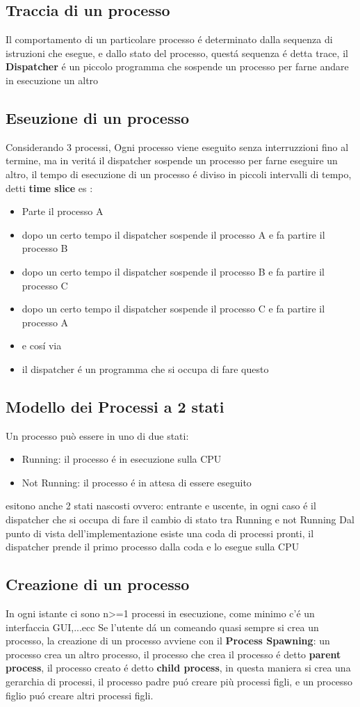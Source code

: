 \subsection{Traccia di un processo}
Il comportamento di un particolare processo é determinato dalla sequenza di istruzioni che esegue, e dallo stato del processo,
questá sequenza é detta trace, il \textbf{Dispatcher} é un piccolo programma che sospende un processo per farne andare in esecuzione un altro
\subsection{Eseuzione di un processo}
Considerando 3 processi, Ogni processo viene eseguito senza interruzzioni fino al termine, ma in veritá il dispatcher
sospende un processo per farne eseguire un altro, il tempo di esecuzione di un processo é diviso in piccoli intervalli
di tempo, detti \textbf{time slice} es :
\begin{itemize}
    \item Parte il processo A
    \item dopo un certo tempo il dispatcher sospende il processo A e fa partire il processo B
    \item dopo un certo tempo il dispatcher sospende il processo B e fa partire il processo C
    \item dopo un certo tempo il dispatcher sospende il processo C e fa partire il processo A
    \item e cosí via
    \item il dispatcher é un programma che si occupa di fare questo
\end{itemize}
\subsection{Modello dei Processi a 2 stati}
Un processo può essere in uno di due stati:
\begin{itemize}
    \item Running: il processo é in esecuzione sulla CPU
    \item Not Running: il processo é in attesa di essere eseguito
\end{itemize}
esitono anche 2 stati nascosti ovvero: entrante e uscente, in ogni caso é il dispatcher che si occupa di fare il cambio di stato tra Running e not Running
Dal punto di vista dell'implementazione esiste una coda di processi pronti, il dispatcher prende il primo processo dalla coda e lo esegue sulla CPU
\subsection{Creazione di un processo}
In ogni istante ci sono n>=1 processi in esecuzione, come minimo c'é un interfaccia GUI,...ecc
Se l'utente dá un comeando quasi sempre si crea un processo, la creazione di un processo avviene con il
\textbf{Process Spawning}: un processo crea un altro processo, il processo che crea il processo é detto \textbf{parent process}, il processo creato é detto \textbf{child process},
in questa maniera si crea una gerarchia di processi, il processo padre puó creare più processi figli, e un processo figlio puó creare altri processi figli.
